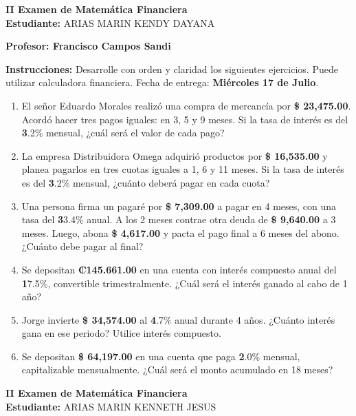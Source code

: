 \documentclass[14pt]{article}
\begin{document}
\begin{center}
    {\LARGE \textbf{II Examen de Matemática Financiera}}\\[1em]
    {\large \textbf{Estudiante:} ARIAS MARIN KENDY DAYANA}
\end{center}

\vspace{1cm}

\textbf{Profesor: Francisco Campos Sandi}

\textbf{Instrucciones:} Desarrolle con orden y claridad los siguientes ejercicios. Puede utilizar calculadora financiera. Fecha de entrega: \textbf{Miércoles 17 de Julio}.

\begin{enumerate}
  \item El señor Eduardo Morales realizó una compra de mercancía por \textbf{\$ 23,475.00}. Acordó hacer tres pagos iguales: en 3, 5 y 9 meses. Si la tasa de interés es del \textbf3.2\% mensual, ¿cuál será el valor de cada pago?

  \item La empresa Distribuidora Omega adquirió productos por \textbf{\$ 16,535.00} y planea pagarlos en tres cuotas iguales a 1, 6 y 11 meses. Si la tasa de interés es del \textbf3.2\% mensual, ¿cuánto deberá pagar en cada cuota?

  \item Una persona firma un pagaré por \textbf{\$ 7,309.00} a pagar en 4 meses, con una tasa del \textbf33.4\% anual. A los 2 meses contrae otra deuda de \textbf{\$ 9,640.00} a 3 meses. Luego, abona \textbf{\$ 4,617.00} y pacta el pago final a 6 meses del abono. ¿Cuánto debe pagar al final?

  \item Se depositan \textbf{₡145.661.00} en una cuenta con interés compuesto anual del \textbf17.5\%, convertible trimestralmente. ¿Cuál será el interés ganado al cabo de 1 año?

  \item Jorge invierte \textbf{\$ 34,574.00} al \textbf4.7\% anual durante 4 años. ¿Cuánto interés gana en ese periodo? Utilice interés compuesto.

  \item Se depositan \textbf{\$ 64,197.00} en una cuenta que paga \textbf2.0\% mensual, capitalizable mensualmente. ¿Cuál será el monto acumulado en 18 meses?
\end{enumerate}
\newpage

\begin{center}
    {\LARGE \textbf{II Examen de Matemática Financiera}}\\[1em]
    {\large \textbf{Estudiante:} ARIAS MARIN KENNETH JESUS}
\end{center}
\end{document}
